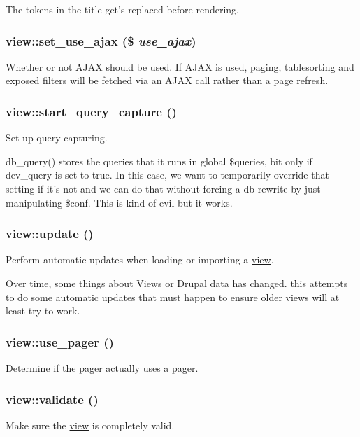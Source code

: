 The tokens in the title get's replaced before rendering. \hypertarget{classview_a77bfc90f75fc5bdbf34cb7f7678c4840}{
\subsubsection[{set\_\-use\_\-ajax}]{\setlength{\rightskip}{0pt plus 5cm}view::set\_\-use\_\-ajax (\$ {\em use\_\-ajax})}}
\label{classview_a77bfc90f75fc5bdbf34cb7f7678c4840}
Whether or not AJAX should be used. If AJAX is used, paging, tablesorting and exposed filters will be fetched via an AJAX call rather than a page refresh. \hypertarget{classview_a1e3efc171324e713e7e130c445dbf84d}{
\subsubsection[{start\_\-query\_\-capture}]{\setlength{\rightskip}{0pt plus 5cm}view::start\_\-query\_\-capture ()}}
\label{classview_a1e3efc171324e713e7e130c445dbf84d}
Set up query capturing.

db\_\-query() stores the queries that it runs in global \$queries, bit only if dev\_\-query is set to true. In this case, we want to temporarily override that setting if it's not and we can do that without forcing a db rewrite by just manipulating \$conf. This is kind of evil but it works. \hypertarget{classview_aa156afa62846e39a15a7e9027d4d58b6}{
\subsubsection[{update}]{\setlength{\rightskip}{0pt plus 5cm}view::update ()}}
\label{classview_aa156afa62846e39a15a7e9027d4d58b6}
Perform automatic updates when loading or importing a \hyperlink{classview}{view}.

Over time, some things about Views or Drupal data has changed. this attempts to do some automatic updates that must happen to ensure older views will at least try to work. \hypertarget{classview_aa8b3c1c132ab039dd24c13c2bccf5948}{
\subsubsection[{use\_\-pager}]{\setlength{\rightskip}{0pt plus 5cm}view::use\_\-pager ()}}
\label{classview_aa8b3c1c132ab039dd24c13c2bccf5948}
Determine if the pager actually uses a pager. \hypertarget{classview_a89950e757cb2da5094b1d413991fc353}{
\subsubsection[{validate}]{\setlength{\rightskip}{0pt plus 5cm}view::validate ()}}
\label{classview_a89950e757cb2da5094b1d413991fc353}
Make sure the \hyperlink{classview}{view} is completely valid.

